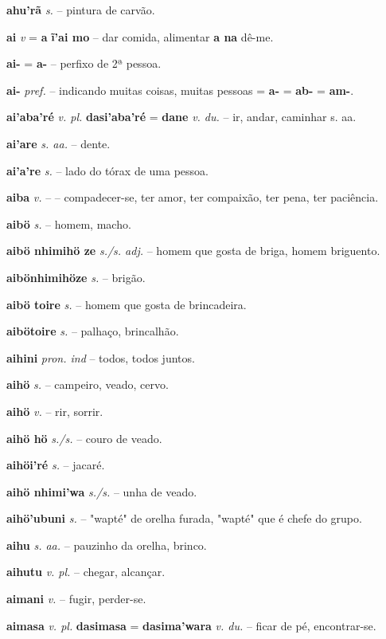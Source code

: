 \textbf{ahu'rã} \textit{s.} -- pintura de carvão.

\textbf{ai} \textit{v} = \textbf{a}  \textbf{ĩ'ai mo} -- dar comida, alimentar  \textbf{a na} dê-me.

\textbf{ai-} = \textbf{a-} -- perfixo de 2ª pessoa.

\textbf{ai-} \textit{pref.} -- indicando muitas coisas, muitas pessoas  = \textbf{a-} = \textbf{ab-} = \textbf{am-}.

\textbf{ai'aba'ré} \textit{v. pl.} \textbf{dasi'aba'ré} = \textbf{dane} \textit{v. du.} -- ir, andar, caminhar s. aa.

\textbf{ai'are} \textit{ s. aa.} -- dente.

\textbf{ai'a're} \textit{s.} -- lado do tórax de uma pessoa.

\textbf{aiba} \textit{v.} -- -- compadecer-se, ter amor, ter compaixão, ter pena, ter paciência.

\textbf{aibö} \textit{s.} -- homem, macho.

\textbf{aibö nhimihö ze} \textit{s./s. adj.} -- homem que gosta de briga, homem briguento.

\textbf{aibönhimihöze} \textit{s.} -- brigão.

\textbf{aibö toire} \textit{s.} -- homem que gosta de brincadeira.

\textbf{aibötoire} \textit{s.} -- palhaço, brincalhão.

\textbf{aihini} \textit{pron. ind} -- todos, todos juntos.

\textbf{aihö} \textit{s.} -- campeiro, veado, cervo.

\textbf{aihö} \textit{v.} -- rir, sorrir.

\textbf{aihö hö} \textit{s./s.} -- couro de veado.

\textbf{aihöi'ré} \textit{s.} -- jacaré.

\textbf{aihö nhimi'wa} \textit{s./s.} -- unha de veado.

\textbf{aihö'ubuni} \textit{s.} -- "wapté" de orelha furada, "wapté" que é chefe do grupo.

\textbf{aihu} \textit{s. aa.} -- pauzinho da orelha, brinco.

\textbf{aihutu} \textit{v. pl.} -- chegar, alcançar.

\textbf{aimani} \textit{v.} -- fugir, perder-se.

\textbf{aimasa} \textit{v. pl.} \textbf{dasimasa} = \textbf{dasima'wara} \textit{v. du.} -- ficar de pé, encontrar-se.

